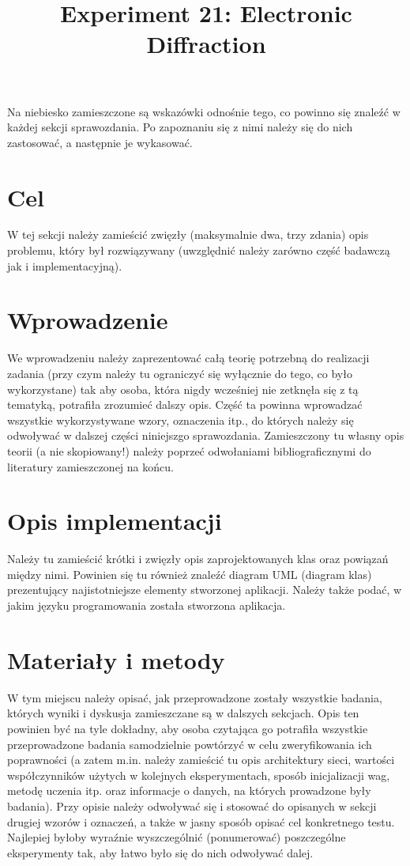 \documentclass{classrep}
\author{%
  \studentinfo{Dominik Odrowski}{181426} \and
  \studentinfo{Krzysztof Palka}{181427}
}
\title{Experiment 21: Electronic Diffraction}
\begin{document}
\maketitle


{\color{blue}Na niebiesko zamieszczone są wskazówki odnośnie tego, co powinno
się znaleźć w każdej sekcji sprawozdania. Po zapoznaniu się z nimi należy się
do nich zastosować, a następnie je wykasować.}

\section{Cel}
{\color{blue} 
W tej sekcji należy zamieścić zwięzły (maksymalnie dwa, trzy zdania) opis
problemu, który był rozwiązywany (uwzględnić należy zarówno część badawczą jak
i implementacyjną).}

\section{Wprowadzenie}
{\color{blue}
We wprowadzeniu należy zaprezentować całą teorię potrzebną do realizacji
zadania (przy czym należy tu ograniczyć się wyłącznie do tego, co było
wykorzystane) tak aby osoba, która nigdy wcześniej nie zetknęła się z tą
tematyką, potrafiła zrozumieć dalszy opis. Część ta powinna wprowadzać
wszystkie wykorzystywane wzory, oznaczenia itp., do których należy się
odwoływać w dalszej części niniejszgo sprawozdania. Zamieszczony tu własny
opis teorii (a nie skopiowany!) należy poprzeć odwołaniami bibliograficznymi
do literatury zamieszczonej na końcu. }

\section{Opis implementacji}
{\color{blue}
Należy tu zamieścić krótki i zwięzły opis zaprojektowanych klas oraz powiązań
między nimi. Powinien się tu również znaleźć diagram UML  (diagram klas)
prezentujący najistotniejsze elementy stworzonej aplikacji. Należy także
podać, w jakim języku programowania została stworzona aplikacja. }

\section{Materiały i metody}
{\color{blue}
W tym miejscu należy opisać, jak przeprowadzone zostały wszystkie badania,
których wyniki i dyskusja zamieszczane są w dalszych sekcjach. Opis ten
powinien być na tyle dokładny, aby osoba czytająca go potrafiła wszystkie
przeprowadzone badania samodzielnie powtórzyć w celu zweryfikowania ich
poprawności (a zatem m.in. należy zamieścić tu opis architektury sieci,
wartości współczynników użytych w kolejnych eksperymentach, sposób
inicjalizacji wag, metodę uczenia itp. oraz informacje o danych, na których
prowadzone były badania). Przy opisie należy odwoływać się i stosować do
opisanych w sekcji drugiej wzorów i oznaczeń, a także w jasny sposób opisać
cel konkretnego testu. Najlepiej byłoby wyraźnie wyszczególnić (ponumerować)
poszczególne eksperymenty tak, aby łatwo było się do nich odwoływać dalej.}
\end{document}
